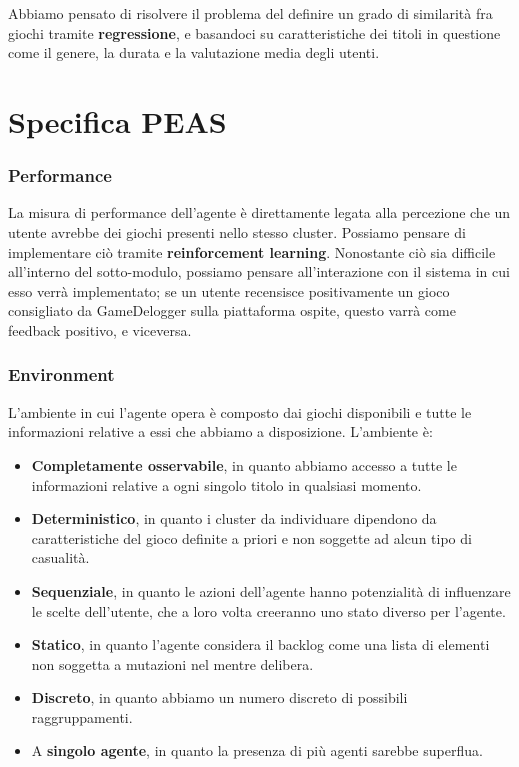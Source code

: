 Abbiamo pensato di risolvere il problema del definire un grado di similarità fra giochi tramite \textbf{regressione}, e basandoci su caratteristiche dei titoli in questione come il genere, la durata e la valutazione media degli utenti.

\section{Specifica PEAS}
    \subsubsection{Performance}
        La misura di performance dell'agente è direttamente legata alla percezione che un utente avrebbe dei giochi presenti nello stesso cluster. Possiamo pensare di implementare ciò tramite \textbf{reinforcement learning}. Nonostante ciò sia difficile all'interno del sotto-modulo, possiamo pensare all'interazione con il sistema in cui esso verrà implementato; se un utente recensisce positivamente un gioco consigliato da GameDelogger sulla piattaforma ospite, questo varrà come feedback positivo, e viceversa.
        
    \subsubsection{Environment}
        L'ambiente in cui l'agente opera è composto dai giochi disponibili e tutte le informazioni relative a essi che abbiamo a disposizione. L'ambiente è:
        \begin{itemize}
            \item \textbf{Completamente osservabile}, in quanto abbiamo accesso a tutte le informazioni relative a ogni singolo titolo in qualsiasi momento.
            \item \textbf{Deterministico}, in quanto i cluster da individuare dipendono da caratteristiche del gioco definite a priori e non soggette ad alcun tipo di casualità.
            \item \textbf{Sequenziale}, in quanto le azioni dell'agente hanno potenzialità di influenzare le scelte dell'utente, che a loro volta creeranno uno stato diverso per l'agente.
            \item \textbf{Statico}, in quanto l'agente considera il backlog come una lista di elementi non soggetta a mutazioni nel mentre delibera.
            \item \textbf{Discreto}, in quanto abbiamo un numero discreto di possibili raggruppamenti.
            \item A \textbf{singolo agente}, in quanto la presenza di più agenti sarebbe superflua.
        \end{itemize}
        
